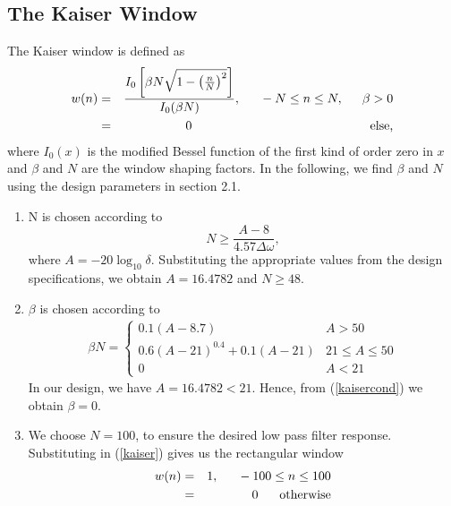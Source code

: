 \documentclass[journal,12pt,twocolumn]{IEEEtran}
\begin{document}
\subsection{The Kaiser Window}
The Kaiser window is defined as
\begin{eqnarray}
\label{kaiser}
w(n) &=& \frac{I_0\left[ \beta N \sqrt{1 - \left(\frac{n}{N}\right)^2} \right]}{I_0(\beta N)},
\indent -N \leq n \leq N, \indent \beta > 0 \nonumber \\
&=& 0 \hspace{5cm} \mbox{else,}
\end{eqnarray}
where $I_0(x)$ is the modified Bessel function of the first kind of order zero in $x$ and $\beta$
and $N$ are the window shaping factors.  In the following,
we find $\beta$ and $N$ using the design parameters in section 2.1.

\begin{enumerate}
\item  N is chosen according to
\begin{equation}
N \geq \frac{A-8}{4.57\Delta \omega},
\end{equation}
where $A = -20\log_{10}\delta$.  Substituting the appropriate values from the design specifications, we obtain
$A = 16.4782$ and $N \geq 48$.

\item  $\beta$ is chosen according to
\begin{eqnarray}
\label{kaisercond}
\beta N = \left\{ \begin{array}{ll} 0.1(A-8.7) & A > 50 \\
0.6(A-21)^{0.4}+ 0.1(A-21) & 21 \leq A \leq 50 \\
0 & A < 21\end{array} \right.
\end{eqnarray}
In our design, we have $A = 16.4782 < 21$.  Hence, from (\ref{kaisercond}) we obtain $\beta = 0$.  

\item We choose $N = 100$, to ensure the desired low pass filter response.  Substituting in (\ref{kaiser})
gives us the rectangular window
\begin{eqnarray}
\label{rect}
w(n) &=& 1, \indent -100 \leq n \leq 100 \nonumber \\
&=& 0 \hspace{6mm} \mbox{otherwise}
\end{eqnarray}
\end{enumerate}
\end{document}
